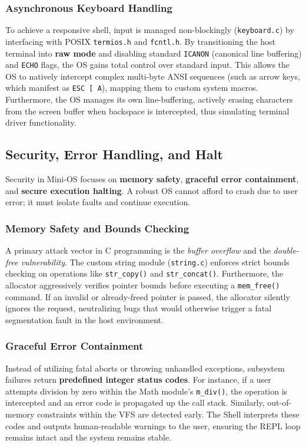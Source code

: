 \documentclass[conference]{IEEEtran}
\begin{document}
\subsubsection{\textbf{Asynchronous Keyboard Handling}}
To achieve a responsive shell, input is managed non-blockingly (\texttt{keyboard.c}) by interfacing with POSIX \texttt{termios.h} and \texttt{fcntl.h}. By transitioning the host terminal into \textbf{raw mode} and disabling standard \texttt{ICANON} (canonical line buffering) and \texttt{ECHO} flags, the OS gains total control over standard input. 
This allows the OS to natively intercept complex multi-byte ANSI sequences (such as arrow keys, which manifest as \texttt{ESC [ A}), mapping them to custom system macros. Furthermore, the OS manages its own line-buffering, actively erasing characters from the screen buffer when backspace is intercepted, thus simulating terminal driver functionality.

\subsection{Security, Error Handling, and Halt}
Security in Mini-OS focuses on \textbf{memory safety}, \textbf{graceful error containment}, and \textbf{secure execution halting}. A robust OS cannot afford to crash due to user error; it must isolate faults and continue execution.

\subsubsection{\textbf{Memory Safety and Bounds Checking}}
A primary attack vector in C programming is the \textit{buffer overflow} and the \textit{double-free vulnerability}. The custom string module (\texttt{string.c}) enforces strict bounds checking on operations like \texttt{str\_copy()} and \texttt{str\_concat()}. Furthermore, the allocator aggressively verifies pointer bounds before executing a \texttt{mem\_free()} command. If an invalid or already-freed pointer is passed, the allocator silently ignores the request, neutralizing bugs that would otherwise trigger a fatal segmentation fault in the host environment.

\subsubsection{\textbf{Graceful Error Containment}}
Instead of utilizing fatal aborts or throwing unhandled exceptions, subsystem failures return \textbf{predefined integer status codes}. For instance, if a user attempts division by zero within the Math module's \texttt{m\_div()}, the operation is intercepted and an error code is propagated up the call stack. Similarly, out-of-memory constraints within the VFS are detected early. The Shell interprets these codes and outputs human-readable warnings to the user, ensuring the REPL loop remains intact and the system remains stable.
\end{document}
